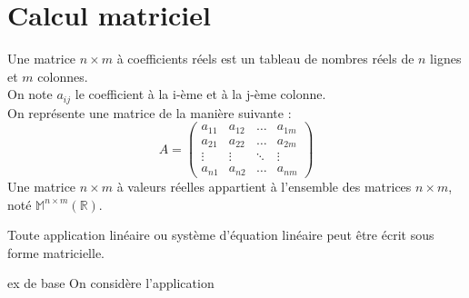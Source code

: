 \chapter{Calcul matriciel}
\begin{defi}
Une matrice $n\times m$ à  coefficients réels est un tableau de nombres réels de $n$ lignes et $m$ colonnes.\\
On note $a_{ij}$ le coefficient à la i-ème  et à la j-ème colonne.\\
On représente une matrice de la manière suivante :
$$A = \begin{pmatrix}a_{11} & a_{12} & \hdots & a_{1m}\\a_{21} & a_{22} & \hdots & a_{2m}\\ \vdots & \vdots & \ddots & \vdots\\ a_{n1} & a_{n2} & \hdots & a_{nm} \end{pmatrix}$$
\newline
Une matrice $n\times m$ à valeurs réelles appartient à l'ensemble des matrices $n\times m$, noté $\mathbb{M}^{n\times m}(\mathbb{R})$.
\end{defi}
Toute application linéaire ou système d'équation linéaire peut être écrit sous forme matricielle.
\begin{ex}
ex de base
On considère l'application
\end{ex}
